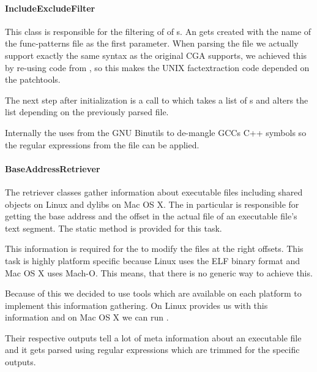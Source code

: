 \paragraph{IncludeExcludeFilter}

This class is responsible for the filtering of  of s.   An  gets created with the name of the func-patterns file as the first parameter.  When parsing the file we actually support exactly the same syntax as the original CGA supports, we achieved this by re-using code from , so this makes the UNIX factextraction code depended on the patchtools.

The next step after initialization is a call to  which takes a list of s and alters the list depending on the previously parsed file.

Internally the  uses  from the GNU Binutils to de-mangle GCCs C++ symbols so the regular expressions from the file can be applied.

\paragraph{BaseAddressRetriever}

The retriever classes gather information about executable files including shared objects on Linux and dylibs on Mac OS X.  The  in particular is responsible for getting the base address and the offset in the actual file of an executable file's text segment.  The static method  is provided for this task.

This information is required for the  to modify the files at the right offsets.  This task is highly platform specific because Linux uses the ELF binary format and Mac OS X uses Mach-O. This means, that there is no generic way to achieve this.

Because of this we decided to use tools which are available on each platform to implement this information gathering.  On Linux  provides us with this information and on Mac OS X we can run .

Their respective outputs tell a lot of meta information about an executable file and it gets parsed using regular expressions which are trimmed for the specific outputs.


